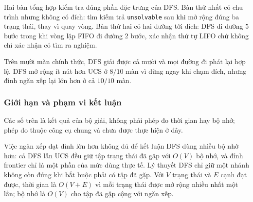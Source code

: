 Hai bàn tổng hợp kiểm tra đúng phần đặc trưng của DFS. Bàn thứ nhất có chu
trình nhưng không có đích: tìm kiếm trả \texttt{unsolvable} sau khi mở rộng
đúng ba trạng thái, thay vì quay vòng. Bàn thứ hai có hai đường tới đích: DFS
đi đường $5$ bước trong khi vòng lặp FIFO đi đường $2$ bước, xác nhận thứ tự
LIFO chứ không chỉ xác nhận có tìm ra nghiệm.

Trên mười màn chính thức, DFS giải được cả mười và mọi đường đi phát lại hợp
lệ. DFS mở rộng ít nút hơn UCS ở $8/10$ màn vì dừng ngay khi chạm đích, nhưng
đỉnh ngăn xếp lại lớn hơn ở cả $10/10$ màn.

\subsubsection{Giới hạn và phạm vi kết luận}
Các số trên là kết quả của bộ giải, không phải phép đo thời gian hay bộ nhớ;
phép đo thuộc công cụ chung và chưa được thực hiện ở đây.

Việc ngăn xếp đạt đỉnh lớn hơn không đủ để kết luận DFS dùng nhiều bộ nhớ hơn:
cả DFS lẫn UCS đều giữ tập trạng thái đã gặp với $O(V)$ bộ nhớ, và đỉnh frontier
chỉ là một phần của mức dùng thực tế. Lý thuyết DFS chỉ giữ một nhánh không còn
đúng khi bắt buộc phải có tập đã gặp. Với $V$ trạng thái và $E$ cạnh đạt được,
thời gian là $O(V+E)$ vì mỗi trạng thái được mở rộng nhiều nhất một lần; bộ nhớ
là $O(V)$ cho tập đã gặp cộng với ngăn xếp.
